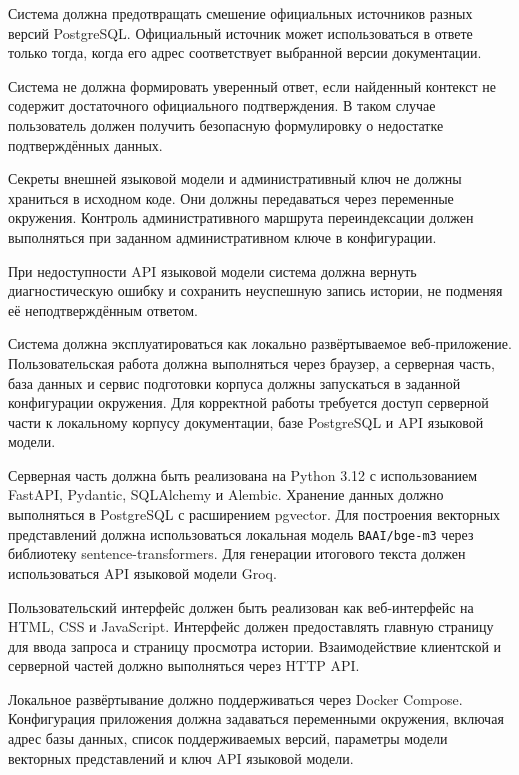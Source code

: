 
Система должна предотвращать смешение официальных источников разных версий PostgreSQL. Официальный источник может использоваться в ответе только тогда, когда его адрес соответствует выбранной версии документации.

Система не должна формировать уверенный ответ, если найденный контекст не содержит достаточного официального подтверждения. В таком случае пользователь должен получить безопасную формулировку о недостатке подтверждённых данных.

Секреты внешней языковой модели и административный ключ не должны храниться в исходном коде. Они должны передаваться через переменные окружения. Контроль административного маршрута переиндексации должен выполняться при заданном административном ключе в конфигурации.

При недоступности API языковой модели система должна вернуть диагностическую ошибку и сохранить неуспешную запись истории, не подменяя её неподтверждённым ответом.


Система должна эксплуатироваться как локально развёртываемое веб-приложение. Пользовательская работа должна выполняться через браузер, а серверная часть, база данных и сервис подготовки корпуса должны запускаться в заданной конфигурации окружения. Для корректной работы требуется доступ серверной части к локальному корпусу документации, базе PostgreSQL и API языковой модели.


Серверная часть должна быть реализована на Python 3.12 с использованием FastAPI, Pydantic, SQLAlchemy и Alembic. Хранение данных должно выполняться в PostgreSQL с расширением pgvector. Для построения векторных представлений должна использоваться локальная модель \texttt{BAAI/bge-m3} через библиотеку sentence-transformers. Для генерации итогового текста должен использоваться API языковой модели Groq.

Пользовательский интерфейс должен быть реализован как веб-интерфейс на HTML, CSS и JavaScript. Интерфейс должен предоставлять главную страницу для ввода запроса и страницу просмотра истории. Взаимодействие клиентской и серверной частей должно выполняться через HTTP API.

Локальное развёртывание должно поддерживаться через Docker Compose. Конфигурация приложения должна задаваться переменными окружения, включая адрес базы данных, список поддерживаемых версий, параметры модели векторных представлений и ключ API языковой модели.


